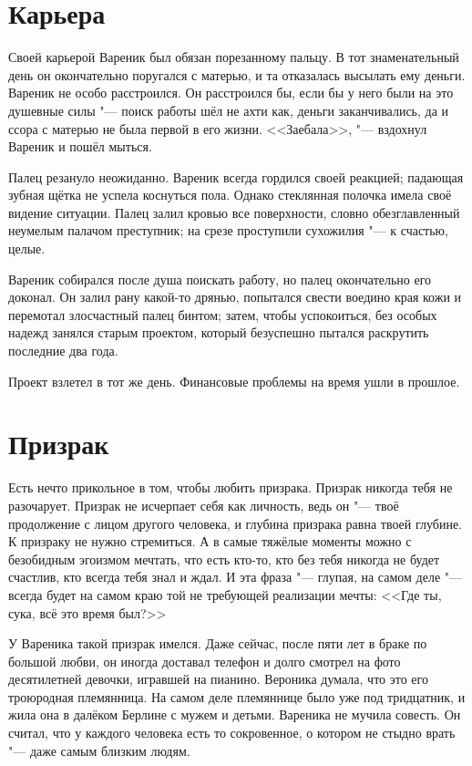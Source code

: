 \section{Карьера}

Своей карьерой Вареник был обязан порезанному пальцу.
В тот знаменательный день он окончательно поругался с матерью, и та отказалась высылать ему деньги.
Вареник не особо расстроился.
Он расстроился бы, если бы у него были на это душевные силы "--- поиск работы шёл не ахти как, деньги заканчивались, да и ссора с матерью не была первой в его жизни.
<<Заебала>>, "--- вздохнул Вареник и пошёл мыться.

Палец резануло неожиданно.
Вареник всегда гордился своей реакцией;
падающая зубная щётка не успела коснуться пола.
Однако стеклянная полочка имела своё видение ситуации.
Палец залил кровью все поверхности, словно обезглавленный неумелым палачом преступник;
на срезе проступили сухожилия "--- к счастью, целые.

Вареник собирался после душа поискать работу, но палец окончательно его доконал. 
Он залил рану какой-то дрянью, попытался свести воедино края кожи и перемотал злосчастный палец бинтом;
затем, чтобы успокоиться, без особых надежд занялся старым проектом, который безуспешно пытался раскрутить последние два года.

Проект взлетел в тот же день.
Финансовые проблемы на время ушли в прошлое.

\section{Призрак}

Есть нечто прикольное в том, чтобы любить призрака.
Призрак никогда тебя не разочарует.
Призрак не исчерпает себя как личность, ведь он "--- твоё продолжение с лицом другого человека, и глубина призрака равна твоей глубине.
К призраку не нужно стремиться.
А в самые тяжёлые моменты можно с безобидным эгоизмом мечтать, что есть кто-то, кто без тебя никогда не будет счастлив, кто всегда тебя знал и ждал.
И эта фраза "--- глупая, на самом деле "--- всегда будет на самом краю той не требующей реализации мечты: <<Где ты, сука, всё это время был?>>

У Вареника такой призрак имелся.
Даже сейчас, после пяти лет в браке по большой любви, он иногда доставал телефон и долго смотрел на фото десятилетней девочки, игравшей на пианино.
Вероника думала, что это его троюродная племянница.
На самом деле племяннице было уже под тридцатник, и жила она в далёком Берлине с мужем и детьми.
Вареника не мучила совесть.
Он считал, что у каждого человека есть то сокровенное, о котором не стыдно врать "--- даже самым близким людям.

